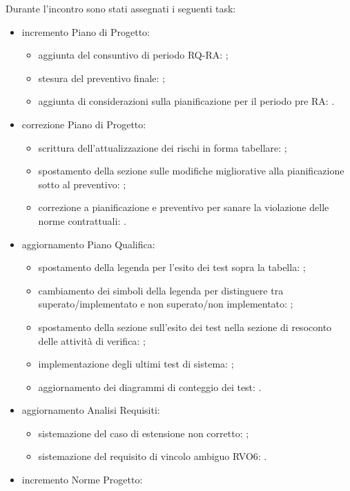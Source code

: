 Durante l'incontro sono stati assegnati i seguenti task:	
\begin{itemize}
	\item incremento Piano di Progetto:
	\begin{itemize}
		\item aggiunta del consuntivo di periodo RQ-RA: \Tommaso{};
		\item stesura del preventivo finale: \Tommaso{};
		\item aggiunta di considerazioni sulla pianificazione per il periodo pre RA: \Tommaso{}.
	\end{itemize}
	\item correzione Piano di Progetto:
	\begin{itemize}
		\item scrittura dell'attualizzazione dei rischi in forma tabellare: \Tommaso{};
		\item spostamento della sezione sulle modifiche migliorative alla pianificazione sotto al preventivo: \Tommaso{};
		\item correzione a pianificazione e preventivo per sanare la violazione delle norme contrattuali: \Tommaso{}.
	\end{itemize}
	\item aggiornamento Piano Qualifica:
	\begin{itemize}
		\item spostamento della legenda per l'esito dei test sopra la tabella: \Luca{};
		\item cambiamento dei simboli della legenda per distinguere tra superato/implementato e non superato/non implementato: \Luca{};
		\item spostamento della sezione sull'esito dei test nella sezione di resoconto delle attività di verifica: \Luca{};
		\item implementazione degli ultimi test di sistema: \Tommaso{};
		\item aggiornamento dei diagrammi di conteggio dei test: \Luca{}.
	\end{itemize}
	\item aggiornamento Analisi Requisiti:
	\begin{itemize}
		\item sistemazione del caso di estensione non corretto: \Mattia{};
		\item sistemazione del requisito di vincolo ambiguo RVO6: \Mattia{}.
	\end{itemize}
	\item incremento Norme Progetto:
	\begin{itemize}

\end{itemize}
\end{itemize}
